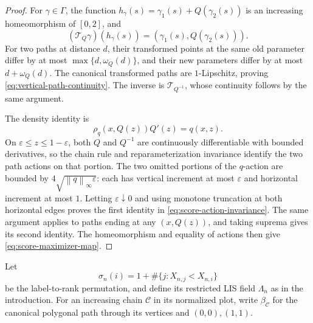 \documentclass[11pt]{article}
\theoremstyle{remark}
\newcommand{\eps}{\varepsilon}
\newcommand{\norm}[1]{\left\lVert #1\right\rVert}
\begin{document}
\begin{proof}
For $\gamma\in\Gamma$, the function
$h_\gamma(s)=\gamma_1(s)+Q(\gamma_2(s))$ is an increasing homeomorphism
of $[0,2]$, and
\[
 (\mathcal T_Q\gamma)(h_\gamma(s))
   =(\gamma_1(s),Q(\gamma_2(s))).
\]
For two paths at distance $d$, their transformed points at the same old
parameter differ by at most $\max\{d,\omega_Q(d)\}$, and their new
parameters differ by at most $d+\omega_Q(d)$.  The canonical transformed
paths are $1$-Lipschitz, proving \eqref{eq:vertical-path-continuity}.
The inverse is $\mathcal T_{Q^{-1}}$, whose continuity follows by the same
argument.

The density identity is
\begin{equation}\label{eq:score-density-transform}
 \rho_q(x,Q(z))Q'(z)=q(x,z).
\end{equation}
On $\eps\le z\le1-\eps$, both $Q$ and $Q^{-1}$ are continuously
differentiable with bounded derivatives, so the chain rule and
reparameterization invariance identify the two path actions on that
portion.  The two omitted portions of the $q$-action are bounded by
$4\sqrt{\norm q_\infty\eps}$: each has vertical increment at most
$\eps$ and horizontal increment at most $1$.  Letting $\eps\downarrow0$
and using monotone truncation at both horizontal edges proves the first
identity in \eqref{eq:score-action-invariance}.  The same argument applies
to paths ending at any $(x,Q(z))$, and taking suprema gives its second
identity.  The homeomorphism and equality of actions then give
\eqref{eq:score-maximizer-map}.
\end{proof}

Let
\[
 \sigma_n(i)=1+\#\{j:X_{n,j}<X_{n,i}\}
\]
be the label-to-rank permutation, and define its restricted LIS field
$\Lambda_n$ as in the introduction.  For an increasing chain $\mathcal C$
in its normalized plot, write $\beta_{\mathcal C}$ for the canonical
polygonal path through its vertices and $(0,0),(1,1)$.
\end{document}
